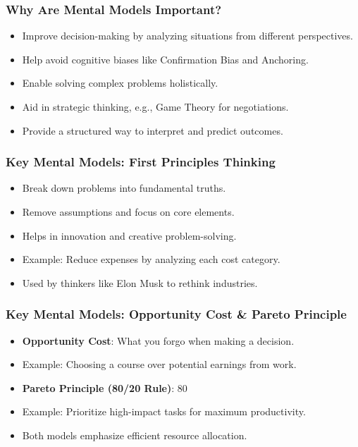 \begin{frame}[fragile]\frametitle{Why Are Mental Models Important?}
    \begin{itemize}
        \item Improve decision-making by analyzing situations from different perspectives.
        \item Help avoid cognitive biases like Confirmation Bias and Anchoring.
        \item Enable solving complex problems holistically.
        \item Aid in strategic thinking, e.g., Game Theory for negotiations.
        \item Provide a structured way to interpret and predict outcomes.
    \end{itemize}
\end{frame}

\begin{frame}[fragile]\frametitle{Key Mental Models: First Principles Thinking}
    \begin{itemize}
        \item Break down problems into fundamental truths.
        \item Remove assumptions and focus on core elements.
        \item Helps in innovation and creative problem-solving.
        \item Example: Reduce expenses by analyzing each cost category.
        \item Used by thinkers like Elon Musk to rethink industries.
    \end{itemize}
\end{frame}

\begin{frame}[fragile]\frametitle{Key Mental Models: Opportunity Cost & Pareto Principle}
    \begin{itemize}
        \item \textbf{Opportunity Cost}: What you forgo when making a decision.
        \item Example: Choosing a course over potential earnings from work.
        \item \textbf{Pareto Principle (80/20 Rule)}: 80%
        \item Example: Prioritize high-impact tasks for maximum productivity.
        \item Both models emphasize efficient resource allocation.
    \end{itemize}
\end{frame}

